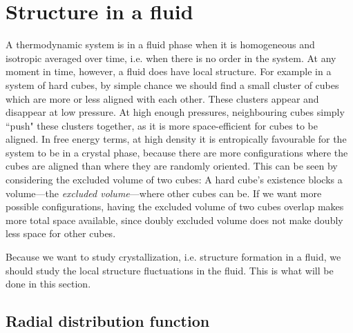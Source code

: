 \documentclass[thesis]{subfiles}
\begin{document}
\section{Structure in a fluid}

A thermodynamic system is in a fluid phase when it is homogeneous and isotropic averaged over time, i.e. when there is no order in the system. At any moment in time, however, a fluid does have local structure. For example in a system of hard cubes, by simple chance we should find a small cluster of cubes which are more or less aligned with each other. These clusters appear and disappear at low pressure. At high enough pressures, neighbouring cubes simply ``push" these clusters together, as it is more space-efficient for cubes to be aligned. In free energy terms, at high density it is entropically favourable for the system to be in a crystal phase, because there are more configurations where the cubes are aligned than where they are randomly oriented. This can be seen by considering the excluded volume of two cubes: A hard cube's existence blocks a volume---the \emph{excluded volume}---where other cubes can be. If we want more possible configurations, having the excluded volume of two cubes overlap makes more total space available, since doubly excluded volume does not make doubly less space for other cubes.

Because we want to study crystallization, i.e. structure formation in a fluid, we should study the local structure fluctuations in the fluid. This is what will be done in this section.

\subsection{Radial distribution function}
\end{document}
